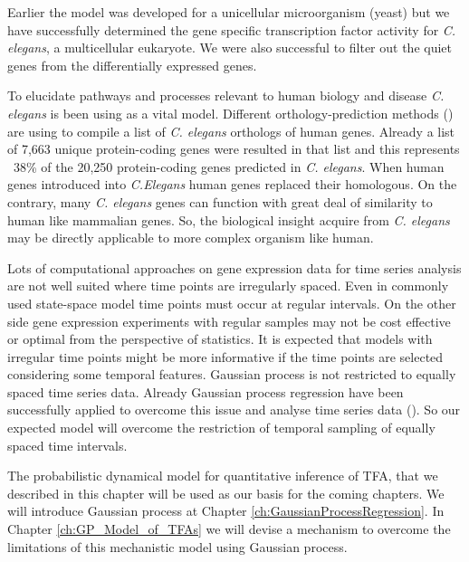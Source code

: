Earlier the model was developed for a unicellular microorganism (yeast) but we have successfully determined the gene specific transcription factor activity for \textit{C. elegans}, a multicellular eukaryote. We were also successful to filter out the quiet genes from the differentially expressed genes.

To elucidate pathways and processes relevant to human biology and disease \textit{C. elegans} is been using as a vital model. Different orthology-prediction methods (\cite{Shaye:2011}) are using to compile a list of \textit{C. elegans} orthologs of human genes. Already a  list of 7,663 unique protein-coding genes were resulted in that list and this represents ~38\% of the 20,250 protein-coding genes predicted in \textit{C. elegans}. When human genes introduced into \textit{C.Elegans} human genes replaced their homologous. On the contrary, many \textit{C. elegans} genes can function with great deal of similarity to human like mammalian genes. So, the biological insight acquire from \textit{C. elegans} may be directly applicable to more complex organism like human.

Lots of computational approaches on gene expression data for time series analysis are not well suited where time points are irregularly spaced. Even in commonly used state-space model time points must occur at regular intervals. On the other side gene expression experiments with regular samples may not be cost effective or optimal from the perspective of statistics. It is expected that models with irregular time points might be more informative if the time points are selected considering some temporal features. Gaussian process is not restricted to equally spaced time series data. Already Gaussian process regression have been successfully applied to overcome this issue and analyse time series data (\cite{Kalaitzis:2011}). So our expected model will overcome the restriction of temporal sampling of equally spaced time intervals. 

The probabilistic dynamical model for quantitative inference of TFA, that we described in this chapter will be used as our basis for the coming chapters. We will introduce Gaussian process at Chapter \ref{ch:GaussianProcessRegression}. In Chapter \ref{ch:GP_Model_of_TFAs} we will devise a mechanism to overcome the limitations of this mechanistic model using Gaussian process.


% 
%
